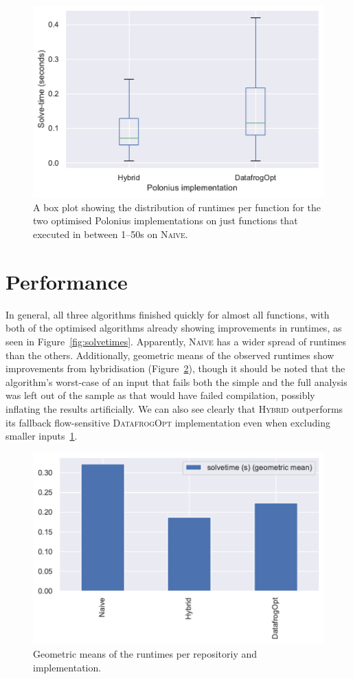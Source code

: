 \documentclass[11pt,a4paper,twoside,openany]{report}
\begin{document}
\begin{figure}
  \includegraphics[width=0.9\linewidth]{Graphs/solvetimes_boxplot_over_1s.pdf}
  \caption[Runtimes Per Function for Longer-Running Inputs]{A box plot showing
    the distribution of runtimes per function for the two optimised Polonius
    implementations on just functions that executed in between 1--50s on
    \textsc{Naive}.}\label{fig:solvetimes-long}
\end{figure}

\section{Performance}\label{sec:inputs:performance}

In general, all three algorithms finished quickly for almost all functions, with
both of the optimised algorithms already showing improvements in runtimes, as
seen in Figure~\ref{fig:solvetimes}. Apparently, \textsc{Naive} has a wider
spread of runtimes than the others. Additionally, geometric means of the
observed runtimes show improvements from hybridisation
(Figure~\ref{fig:solvetimes-gmean-repo}), though it should be noted that the
algorithm's worst-case of an input that fails both the simple and the full
analysis was left out of the sample as that would have failed compilation,
possibly inflating the results artificially. We can also see clearly that
\textsc{Hybrid} outperforms its fallback flow-sensitive \textsc{DatafrogOpt}
implementation even when excluding smaller inputs~\ref{fig:solvetimes-long}.

\begin{figure}
  \includegraphics[width=0.5\linewidth]{Graphs/solvetimes_repo_gmean.pdf}
  \caption[Geometric Means of Runtimes Per Repository]{Geometric means of the
    runtimes per repositoriy and implementation.}\label{fig:solvetimes-gmean-repo}
\end{figure}
\end{document}
